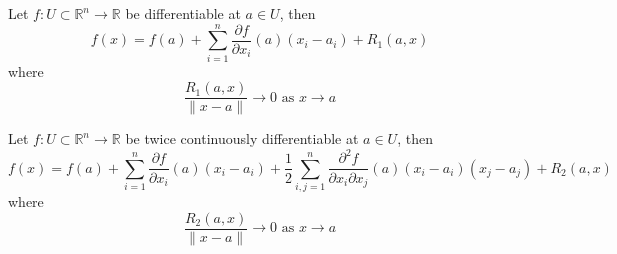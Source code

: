 \documentclass[openany]{book}
\newcommand{\R}{\mathbb{R}}
\begin{document}
\begin{defn}
    Let $f:U\subset\R^n\to\R$ be differentiable at $a\in U$, then 
    \begin{equation*}
        f(x)=f(a)+\sum_{i=1}^n\frac{\partial f}{\partial x_i}(a)(x_i-a_i)+R_1(a,x)
    \end{equation*}
    where 
    \begin{equation*}
        \frac{R_1(a,x)}{\|x-a\|}\to 0 \text{ as } x\to a
    \end{equation*}
\end{defn}

\begin{defn}\label{taylor}
    Let $f:U\subset\R^n\to\R$ be twice continuously differentiable at $a\in U$, then 
    \begin{equation*}
        f(x)=f(a)+\sum_{i=1}^n\frac{\partial f}{\partial x_i}(a)(x_i-a_i)+\frac{1}{2}\sum_{i,j=1}^n\frac{\partial^2 f}{\partial x_i\partial x_j}(a)(x_i-a_i)(x_j-a_j)+R_2(a,x)
    \end{equation*}
    where 
    \begin{equation*}
        \frac{R_2(a,x)}{\|x-a\|}\to 0 \text{ as } x\to a
    \end{equation*}
\end{defn}





\end{document}
